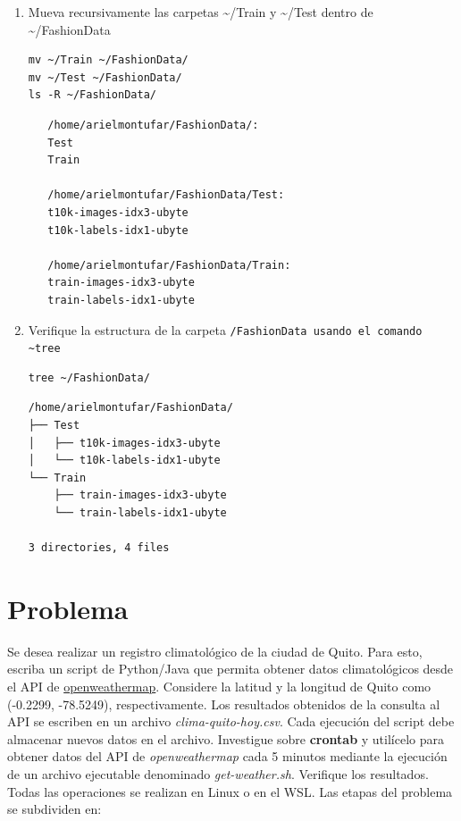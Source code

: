 \documentclass{article}
\begin{document}
\begin{enumerate}
\item Mueva recursivamente las carpetas \textasciitilde{}/Train y \textasciitilde{}/Test dentro de \textasciitilde{}/FashionData
\begin{verbatim}
mv ~/Train ~/FashionData/
mv ~/Test ~/FashionData/
ls -R ~/FashionData/
\end{verbatim}

\begin{verbatim}
   /home/arielmontufar/FashionData/:
   Test
   Train

   /home/arielmontufar/FashionData/Test:
   t10k-images-idx3-ubyte
   t10k-labels-idx1-ubyte

   /home/arielmontufar/FashionData/Train:
   train-images-idx3-ubyte
   train-labels-idx1-ubyte
\end{verbatim}

\item Verifique la estructura de la carpeta \texttt{/FashionData usando el
   comando \textasciitilde{}tree}
\begin{verbatim}
tree ~/FashionData/
\end{verbatim}

\begin{verbatim}
/home/arielmontufar/FashionData/
├── Test
│   ├── t10k-images-idx3-ubyte
│   └── t10k-labels-idx1-ubyte
└── Train
    ├── train-images-idx3-ubyte
    └── train-labels-idx1-ubyte

3 directories, 4 files
\end{verbatim}
\end{enumerate}



\section{Problema}
\label{sec:orgcc5575e}
Se desea realizar un registro climatológico de la ciudad de
Quito. Para esto, escriba un script de Python/Java que permita obtener
datos climatológicos desde el API de
\href{https://openweathermap.org/current\#one}{openweathermap}. Considere la latitud y la longitud de Quito como
(-0.2299, -78.5249), respectivamente. Los resultados obtenidos de
la consulta al API se escriben en un archivo
\emph{clima-quito-hoy.csv}. Cada ejecución del script debe almacenar
nuevos datos en el archivo. Investigue sobre \textbf{crontab} y utilícelo
para obtener datos del API de \emph{openweathermap} cada 5 minutos
mediante la ejecución de un archivo ejecutable denominado
\emph{get-weather.sh}. Verifique los resultados. Todas las operaciones
se realizan en Linux o en el WSL. Las etapas del problema se
subdividen en:
\end{document}
